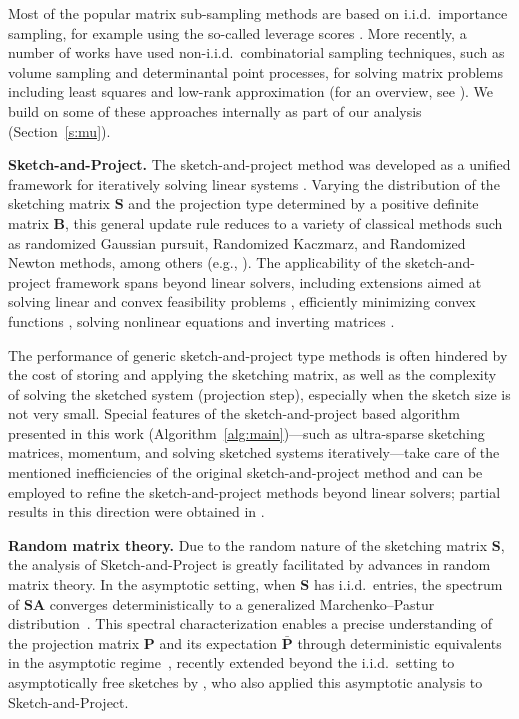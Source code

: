 \documentclass[11pt]{article}
\def\A{{\mathbf A}}
\def\B{{\mathbf B}}
\def\S{{\mathbf S}}
\def\P{{\mathbf P}}
\begin{document}
Most of the popular matrix sub-sampling methods are based on i.i.d.\ importance sampling, for example using the so-called leverage scores \cite{drineas2006sampling,drineas2012fast}. More recently, a number of works have used non-i.i.d.\ combinatorial sampling techniques, such as volume sampling and determinantal point processes, for solving matrix problems including least squares and low-rank approximation (for an overview, see \cite{derezinski2021determinantal}). We build on some of these approaches internally as part of our analysis (Section~\ref{s:mu}).

\smallskip

\noindent
\textbf{Sketch-and-Project.} The sketch-and-project method was developed as a unified framework  for iteratively solving linear systems \cite{gower2015randomized}. Varying the distribution of the sketching matrix $\S$ and the projection type determined by a positive definite matrix $\B$, this general update rule reduces to a variety of classical methods such as  randomized Gaussian pursuit, Randomized Kaczmarz, and Randomized Newton methods, among others (e.g., \cite{gower2019rsn, gower2015randomized}). The applicability of the sketch-and-project framework spans beyond linear solvers, including extensions  aimed at solving linear and convex feasibility problems \cite{necoara2019randomized}, efficiently minimizing convex functions \cite{gower2019rsn,hanzely2020stochastic}, solving nonlinear equations \cite{yuan2022sketched} and inverting matrices \cite{gower2017randomized}. 

The performance of generic sketch-and-project type methods is often hindered by the cost of storing and applying the sketching matrix, as well as the complexity of solving the sketched system (projection step), especially when the sketch size is not very small. Special features of the sketch-and-project based algorithm presented in this work (Algorithm~\ref{alg:main})---such as ultra-sparse sketching matrices, momentum, and solving sketched systems iteratively---take care of the mentioned inefficiencies of the original sketch-and-project method and can be employed to refine the sketch-and-project methods beyond linear solvers; partial results in this direction were obtained in \cite{hanzely2018sega,gazagnadou2022ridgesketch,derezinski2021sparse,derezinski2023solving}. 

\smallskip

\noindent
\textbf{Random matrix theory.}
Due to the random nature of the sketching matrix $\S$, the analysis of Sketch-and-Project is greatly facilitated by advances in random matrix theory. In the asymptotic setting, when $\S$ has i.i.d.\ entries, the spectrum of $\S\A$ converges deterministically to a generalized Marchenko--Pastur distribution~\cite{silverstein1995empirical}. This spectral characterization enables a precise understanding of the projection matrix $\P$ and its expectation $\bar \P$ through deterministic equivalents in the asymptotic regime~\cite{hachem2007deterministic,rubio2011spectral}, recently extended beyond the i.i.d.\ setting to asymptotically free sketches by \cite{lejeune2024asymptotics}, who also applied this asymptotic analysis to Sketch-and-Project.
\end{document}
